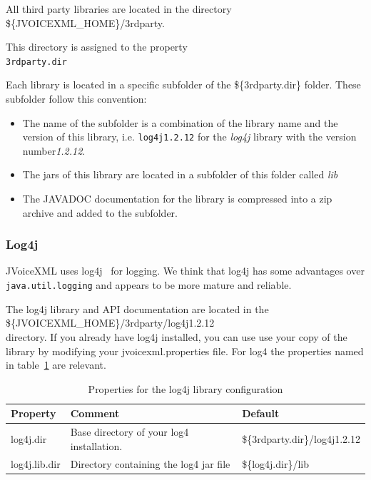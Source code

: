 \documentclass[11pt,a4paper]{article}
\begin{document}
All third party libraries are located in the directory \\
\$\{JVOICEXML\_HOME\}/3rdparty.

This directory is assigned to the property \\
\texttt{3rdparty.dir}

Each library is located in a specific subfolder of the \$\{3rdparty.dir\}
folder. These subfolder follow this convention:

\begin{itemize}
\item The name of the subfolder is a combination of the library name and
the version of this library, i.e. \texttt{log4j1.2.12} for the \emph{log4j}
library with the version number\emph{1.2.12}.
\item The jars of this library are located in a subfolder of this folder
called \emph{lib}
\item The JAVADOC documentation for the library is compressed into a zip
archive and added to the subfolder.
\end{itemize}

\subsubsection{Log4j}
\label{sec:log4j}

JVoiceXML uses log4j~\cite{apache:log4j} for logging. We think that log4j has 
some advantages
over \texttt{java.util.logging} and appears to be more mature and reliable.

The log4j library and API documentation are located in the \\
\$\{JVOICEXML\_HOME\}/3rdparty/log4j1.2.12 \\
directory. If you already have log4j installed, you can use
use your copy of the library by modifying your jvoicexml.properties file.
For log4 the properties named in table~\ref{tab:log4_properties} are relevant.

\begin{table}[h]
\caption{Properties for the log4j library configuration}
\label{tab:log4_properties}

\begin{center}

\begin{tabular}{|l|p{4cm}|l|}
\hline
\textbf{Property} & \textbf{Comment} & \textbf{Default} \\
\hline
\hline
log4j.dir & 
Base directory of your log4 installation.
& \$\{3rdparty.dir\}/log4j1.2.12 \\
\hline
log4j.lib.dir & 
Directory containing the log4 jar file 
& \$\{log4j.dir\}/lib \\
\hline
\end{tabular}
\end{center}

\end{table}
\end{document}
